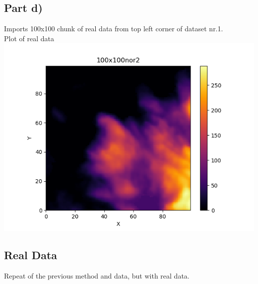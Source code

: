 \documentclass[a4paper,norsk]{article}
\begin{document}
\subsection{Part d)}
Imports 100x100 chunk of real data from top left corner of dataset nr.1.
\\Plot of real data
\\ \includegraphics[scale=.7]{100x100nor2}
\clearpage
\subsection{Real Data}
Repeat of the previous method and data, but with real data.
\end{document}
